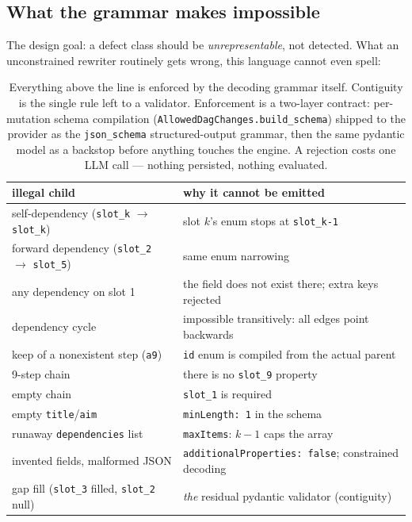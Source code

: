 \documentclass[11pt]{article}
\begin{document}
\subsection{What the grammar makes impossible}
The design goal: a defect class should be \emph{unrepresentable}, not detected. What an
unconstrained rewriter routinely gets wrong, this language cannot even spell:
\begin{table}[H]\centering\small
\begin{tabular}{ll}
\toprule
illegal child & why it cannot be emitted \\
\midrule
self-dependency (\texttt{slot\_k} $\to$ \texttt{slot\_k}) & slot $k$'s enum stops at \texttt{slot\_{k-1}} \\
forward dependency (\texttt{slot\_2} $\to$ \texttt{slot\_5}) & same enum narrowing \\
any dependency on slot 1 & the field does not exist there; extra keys rejected \\
dependency cycle & impossible transitively: all edges point backwards \\
keep of a nonexistent step (\texttt{a9}) & \texttt{id} enum is compiled from the actual parent \\
9-step chain & there is no \texttt{slot\_9} property \\
empty chain & \texttt{slot\_1} is required \\
empty \texttt{title}/\texttt{aim} & \texttt{minLength: 1} in the schema \\
runaway \texttt{dependencies} list & \texttt{maxItems}: $k-1$ caps the array \\
invented fields, malformed JSON & \texttt{additionalProperties: false}; constrained decoding \\
\midrule
gap fill (\texttt{slot\_3} filled, \texttt{slot\_2} null) & \emph{the} residual pydantic validator (contiguity) \\
\bottomrule
\end{tabular}
\caption{Everything above the line is enforced by the decoding grammar itself. Contiguity is
the single rule left to a validator. Enforcement is a two-layer contract: per-mutation schema
compilation (\texttt{AllowedDagChanges.build\_schema}) shipped to the provider as the
\texttt{json\_schema} structured-output grammar, then the same pydantic model as a backstop
before anything touches the engine. A rejection costs one LLM call --- nothing persisted,
nothing evaluated.}
\end{table}
\end{document}
